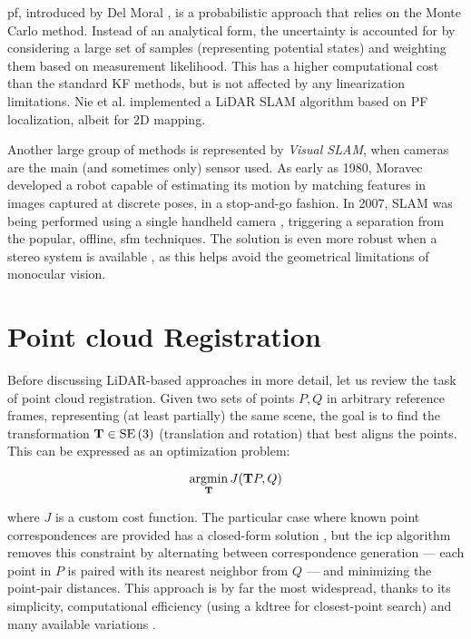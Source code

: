 \acrfull{pf}, introduced by Del Moral \cite{del1997nonlinear}, is a probabilistic approach that relies on the Monte Carlo method. Instead of an analytical form, the uncertainty is accounted for by considering a large set of samples (representing potential states) and weighting them based on measurement likelihood. This has a higher computational cost than the standard KF methods, but is not affected by any linearization limitations. Nie et al. \cite{lcpf2020} implemented a LiDAR SLAM algorithm based on PF localization, albeit for 2D mapping.

Another large group of methods is represented by \emph{Visual SLAM}, when cameras are the main (and sometimes only) sensor used. As early as 1980, Moravec \cite{moravec1980obstacle} developed a robot capable of estimating its motion by matching features in images captured at discrete poses, in a stop-and-go fashion. In 2007, SLAM was being performed using a single handheld camera \cite{davison2007monoslam} \cite{klein2007parallel}, triggering a separation from the popular, offline, \gls{sfm} techniques. The solution is even more robust when a stereo system is available \cite{mei2011rslam}, as this helps avoid the geometrical limitations of monocular vision.

\section{Point cloud Registration}

Before discussing LiDAR-based approaches in more detail, let us review the task of point cloud registration. Given two sets of points $P, Q$ in arbitrary reference frames, representing (at least partially) the same scene, the goal is to find the transformation $\mathbf{T} \in \operatorname{SE}\left(3\right) $ (translation and rotation) that best aligns the points. This can be expressed as an optimization problem:

\begin{equation}\notag
    \underset{\mathbf{T}}{\operatorname{argmin}}\,J(\mathbf{T}P, Q)
\end{equation}

where $J$ is a custom cost function. The particular case where known point correspondences are provided has a closed-form solution \cite{arun1987leastsquares}, but the \acrfull{icp} algorithm \cite{besl1992method} removes this constraint by alternating between correspondence generation --- each point in $P$ is paired with its nearest neighbor from $Q$ --- and minimizing the point-pair distances. This approach is by far the most widespread, thanks to its simplicity, computational efficiency (\eg using a \gls{kdtree} for closest-point search) and many available variations \cite{rusinkiewicz2001efficient} \cite{huang2021comprehensivesurveypointcloud}.

